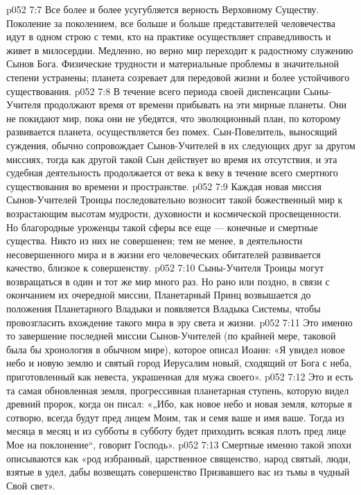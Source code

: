 \vs p052 7:7 \pc Все более и более усугубляется верность Верховному Существу. Поколение за поколением, все больше и больше представителей человечества идут в одном строю с теми, кто на практике осуществляет справедливость и живет в милосердии. Медленно, но верно мир переходит к радостному служению Сынов Бога. Физические трудности и материальные проблемы в значительной степени устранены; планета созревает для передовой жизни и более устойчивого существования.
\vs p052 7:8 \pc В течение всего периода своей диспенсации Сыны\hyp{}Учителя продолжают время от времени прибывать на эти мирные планеты. Они не покидают мир, пока они не убедятся, что эволюционный план, по которому развивается планета, осуществляется без помех. Сын\hyp{}Повелитель, выносящий суждения, обычно сопровождает Сынов\hyp{}Учителей в их следующих друг за другом миссиях, тогда как другой такой Сын действует во время их отсутствия, и эта судебная деятельность продолжается от века к веку в течение всего смертного существования во времени и пространстве.
\vs p052 7:9 Каждая новая миссия Сынов\hyp{}Учителей Троицы последовательно возносит такой божественный мир к возрастающим высотам мудрости, духовности и космической просвещенности. Но благородные уроженцы такой сферы все еще --- конечные и смертные существа. Никто из них не совершенен; тем не менее, в деятельности несовершенного мира и в жизни его человеческих обитателей развивается качество, близкое к совершенству.
\vs p052 7:10 \pc Сыны\hyp{}Учителя Троицы могут возвращаться в один и тот же мир много раз. Но рано или поздно, в связи с окончанием их очередной миссии, Планетарный Принц возвышается до положения Планетарного Владыки и появляется Владыка Системы, чтобы провозгласить вхождение такого мира в эру света и жизни.
\vs p052 7:11 Это именно то завершение последней миссии Сынов\hyp{}Учителей (по крайней мере, таковой была бы хронология в обычном мире), которое описал Иоанн: «Я увидел новое небо и новую землю и святый город Иерусалим новый, сходящий от Бога с неба, приготовленный как невеста, украшенная для мужа своего».
\vs p052 7:12 Это и есть та самая обновленная земля, прогрессивная планетарная ступень, которую видел древний пророк, когда он писал: «„Ибо, как новое небо и новая земля, которые я сотворю, всегда будут пред лицем Моим, так и семя ваше и имя ваше. Тогда из месяца в месяц и из субботы в субботу будет приходить всякая плоть пред лице Мое на поклонение“, говорит Господь».
\vs p052 7:13 Смертные именно такой эпохи описываются как «род избранный, царственное священство, народ святый, люди, взятые в удел, дабы возвещать совершенство Призвавшего вас из тьмы в чудный Свой свет».
